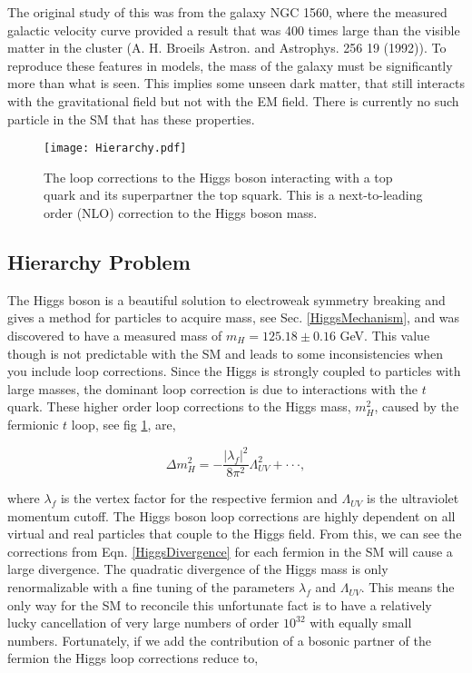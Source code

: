 The original study of this was from the galaxy NGC 1560, where the measured galactic velocity curve provided a result that was 400 times large than the visible matter in the cluster (A. H. Broeils Astron. and Astrophys. 256 19 (1992)).  To reproduce these features in models, the mass of the galaxy must be significantly more than what is seen. This implies some unseen dark matter, that still interacts with the gravitational field but not with the EM field. There is currently no such particle in the SM that has these properties.

\begin{figure}
 	\centering
	\texttt{[image: Hierarchy.pdf]}
 	\caption{The loop corrections to the Higgs boson interacting with a top quark and its superpartner the top squark. This is a next-to-leading order (NLO) correction to the Higgs boson mass.}
 	\label{HiggsMass} 
\end{figure}

\subsection{Hierarchy Problem} 
The Higgs boson is a beautiful solution to electroweak symmetry breaking and gives a method for particles to acquire mass, see Sec. \ref{HiggsMechanism},  and was discovered to have a measured mass of $m_{H}=125.18\pm0.16$ GeV. This value though is not predictable with the SM and leads to some inconsistencies when you include loop corrections. Since the Higgs is strongly coupled to particles with large masses, the dominant loop correction is due to interactions with the $t$ quark. These higher order loop corrections to the Higgs mass, $m_H^2$, caused by the fermionic $t$ loop, see fig \ref{HiggsMass}, are,

\begin{equation} \label{HiggsDivergence}
\Delta m_{H}^{2}=-\frac{|\lambda_{f}|^{2}}{8\pi^{2}}\Lambda_{UV}^{2}+\cdot\cdot\cdot,
\end{equation}

where $\lambda_f$ is the vertex factor for the respective fermion and $\Lambda_{UV}$ is the ultraviolet momentum cutoff. The Higgs boson loop corrections are highly dependent on all virtual and real particles that couple to the Higgs field. From this, we can see the corrections from Eqn. \ref{HiggsDivergence} for each fermion in the SM will cause a large divergence. The quadratic divergence of the Higgs mass is only renormalizable with a fine tuning of the parameters $\lambda_f$ and $\Lambda_{UV}$. This means the only way for the SM to reconcile this unfortunate fact is to have a relatively lucky cancellation of very large numbers of order $10^{32}$ with equally small numbers. Fortunately, if we add the contribution of a bosonic partner of the fermion the Higgs loop corrections reduce to,

